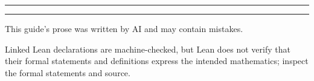 \documentclass[a4paper]{article}
\begin{document}
\begin{titlepage}
  \thispagestyle{empty}
  \vspace*{0.22\textheight}
  \begin{center}
    \rule{0.68\textwidth}{0.5pt}
    \vspace{2.2em}

    {\Huge\bfseries \blueprinttitle\par}
    \vspace{1.2em}
    {\Large \blueprintsubtitle\par}

    \vspace{2.2em}
    \rule{0.68\textwidth}{0.5pt}
  \end{center}
  \vspace{2.4em}
  \vfill
  \begin{center}
    {\small \blueprintprovenance\par}
    \vspace{0.8em}
    {\small This guide's prose was written by AI and may contain mistakes.\par}
    \vspace{0.35em}
    {\small Linked Lean declarations are machine-checked, but Lean does not verify that their
      formal statements and definitions express the intended mathematics; inspect the formal
      statements and source.\par}
  \end{center}
\end{titlepage}




\end{document}
